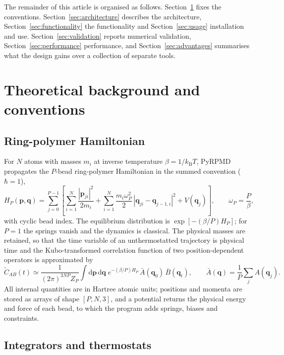 \documentclass[preprint,12pt]{elsarticle}
\newcommand{\kB}{k_{\mathrm{B}}}
\begin{document}
The remainder of this article is organised as follows. Section~\ref{sec:theory} fixes the conventions. Section~\ref{sec:architecture} describes the architecture, Section~\ref{sec:functionality} the functionality and Section~\ref{sec:usage} installation and use. Section~\ref{sec:validation} reports numerical validation, Section~\ref{sec:performance} performance, and Section~\ref{sec:advantages} summarises what the design gains over a collection of separate tools.

\section{Theoretical background and conventions}
\label{sec:theory}

\subsection{Ring-polymer Hamiltonian}

For $N$ atoms with masses $m_i$ at inverse temperature $\beta=1/\kB T$, PyRPMD propagates the $P$-bead ring-polymer Hamiltonian in the summed convention ($\hbar=1$),
\begin{equation}
H_P(\mathbf p,\mathbf q)=\sum_{j=0}^{P-1}\left[\sum_{i=1}^{N}\frac{|\mathbf p_{ji}|^{2}}{2m_i}
+\sum_{i=1}^{N}\frac{m_i\omega_P^{2}}{2}\,|\mathbf q_{ji}-\mathbf q_{j-1,i}|^{2}+V(\mathbf q_j)\right],
\qquad \omega_P=\frac{P}{\beta},
\label{eq:hamiltonian}
\end{equation}
with cyclic bead index. The equilibrium distribution is $\exp[-(\beta/P)H_P]$; for $P=1$ the springs vanish and the dynamics is classical. The physical masses are retained, so that the time variable of an unthermostatted trajectory is physical time and the Kubo-transformed correlation function of two position-dependent operators is approximated by \cite{rpm04}
\begin{equation}
\tilde C_{AB}(t)\simeq\frac{1}{(2\pi)^{3NP}Z_P}\int\!\mathrm d\mathbf p\,\mathrm d\mathbf q\;
e^{-(\beta/P)H_P}\,\bar A(\mathbf q_0)\,\bar B(\mathbf q_t),\qquad
\bar A(\mathbf q)=\frac1P\sum_{j}A(\mathbf q_j).
\end{equation}
All internal quantities are in Hartree atomic units; positions and momenta are stored as arrays of shape $[P,N,3]$, and a potential returns the physical energy and force of each bead, to which the program adds springs, biases and constraints.

\subsection{Integrators and thermostats}
\end{document}

